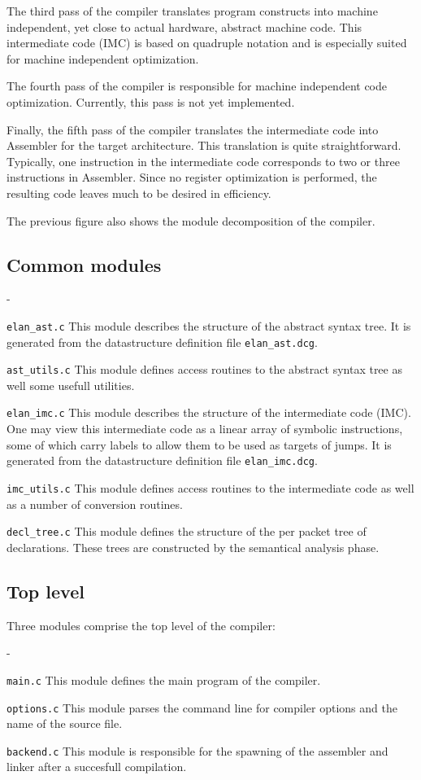 \documentclass [a4paper,12pt,fleqn]{article}
\begin{document}
The third pass of the compiler translates program constructs into
machine independent, yet close to actual hardware, abstract machine code.
This intermediate code (IMC) is based on quadruple notation and is
especially suited for machine independent optimization.

The fourth pass of the compiler is responsible for machine independent
code optimization. Currently, this pass is not yet implemented.

Finally, the fifth pass of the compiler translates the intermediate code
into Assembler for the target architecture. This translation is quite
straightforward. Typically, one instruction in the intermediate code
corresponds to two or three instructions in Assembler. Since no register
optimization is performed, the resulting code leaves much to be desired
in efficiency.

The previous figure also shows the module decomposition of the \ELAN compiler.
\subsection {Common modules}
\begin {list}{-}{}
\item [ {\tt elan\_ast.c} ]
This module describes the structure of the abstract syntax tree. It is
generated from the datastructure definition file {\tt elan\_ast.dcg}.
\item [ {\tt ast\_utils.c} ]
This module defines access routines to the abstract syntax tree as well
some usefull utilities.
\item [ {\tt elan\_imc.c} ]
This module describes the structure of the intermediate code (IMC).
One may view this intermediate code as a linear array of symbolic
instructions, some of which carry labels to allow them to be used as
targets of jumps.
It is generated from the datastructure definition file {\tt elan\_imc.dcg}.
\item [ {\tt imc\_utils.c} ]
This module defines access routines to the intermediate code as well
as a number of conversion routines.
\item [ {\tt decl\_tree.c} ]
This module defines the structure of the per packet tree of declarations.
These trees are constructed by the semantical analysis phase.
\end{list}
\subsection {Top level}
Three modules comprise the top level of the \ELAN compiler:
\begin {list}{-}{}
\item [ {\tt main.c} ]
This module defines the main program of the \ELAN compiler.
\item [ {\tt options.c} ]
This module parses the command line for compiler options and
the name of the source file.
\item [ {\tt backend.c} ]
This module is responsible for the spawning of the assembler and linker
after a succesfull compilation.
\end{list}
\end{document}
